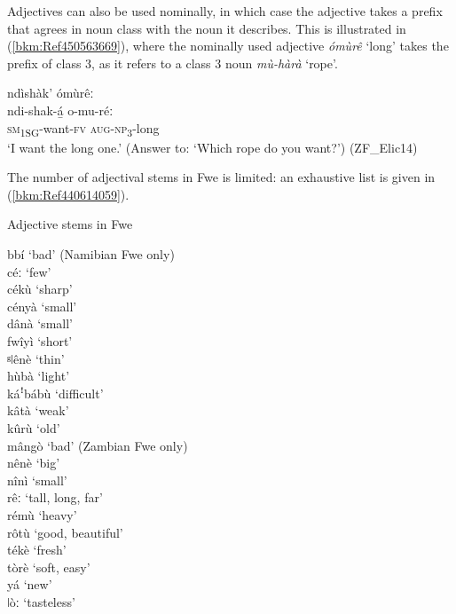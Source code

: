 Adjectives can also be used nominally, in which case the adjective takes a prefix that agrees in noun class with the noun it describes. This is illustrated in (\ref{bkm:Ref450563669}), where the nominally used adjective \textit{ómùrê} ‘long’ takes the prefix of class 3, as it refers to a class 3 noun \textit{mù-hàrà} ‘rope’.

\ea
\label{bkm:Ref450563669}
ndìshàk’ ómùrêː\\
\gll ndi-shak-á̲    o-mu-réː\\
\textsc{sm}\textsubscript{1SG}-want-\textsc{fv}  \textsc{aug}-\textsc{np}\textsubscript{3}-long\\
\glt ‘I want the long one.’ (Answer to: ‘Which rope do you want?’) (ZF\_Elic14)
\z

The number of adjectival stems in Fwe is limited: an exhaustive list is given in (\ref{bkm:Ref440614059}).

\ea
\label{bkm:Ref440614059}
  Adjective stems in Fwe

bbí \tab ‘bad’ (Namibian Fwe only)\\
céː \tab ‘few’\\
cékù \tab ‘sharp’\\
cényà \tab ‘small’\\
dânà \tab ‘small’\\
fwîyì \tab ‘short’\\
ᵍǀênè \tab ‘thin’\\
hùbà \tab ‘light’\\
káꜝbábù \tab ‘difficult’\footnotemark{}\\
kâtà \tab ‘weak’\footnotemark{}\\
kûrù \tab ‘old’\\
mângò \tab ‘bad’ (Zambian Fwe only)\\
nênè \tab ‘big’\\
nînì \tab ‘small’\\
rêː \tab ‘tall, long, far’\\
rémù \tab ‘heavy’\footnotemark{}\\
rôtù \tab ‘good, beautiful’\\
tékè \tab ‘fresh’\\
tòrè \tab ‘soft, easy’\\
yá \tab ‘new’\\
{}ǀòː \tab ‘tasteless’\\
\z

\addtocounter{footnote}{-3}

